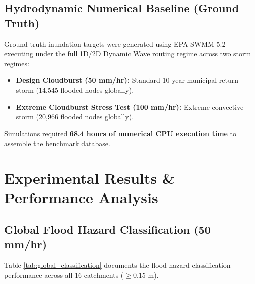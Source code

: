 \documentclass[conference]{IEEEtran}
\begin{document}
\subsection{Hydrodynamic Numerical Baseline (Ground Truth)}
Ground-truth inundation targets were generated using EPA SWMM 5.2 executing under the full 1D/2D Dynamic Wave routing regime across two storm regimes:
\begin{itemize}
    \item \textbf{Design Cloudburst (50 mm/hr):} Standard 10-year municipal return storm (14,545 flooded nodes globally).
    \item \textbf{Extreme Cloudburst Stress Test (100 mm/hr):} Extreme convective storm (20,966 flooded nodes globally).
\end{itemize}
Simulations required \textbf{68.4 hours of numerical CPU execution time} to assemble the benchmark database.

\section{Experimental Results \& Performance Analysis}

\subsection{Global Flood Hazard Classification (50 mm/hr)}
Table \ref{tab:global_classification} documents the flood hazard classification performance across all 16 catchments ($\ge 0.15\text{ m}$).
\end{document}
